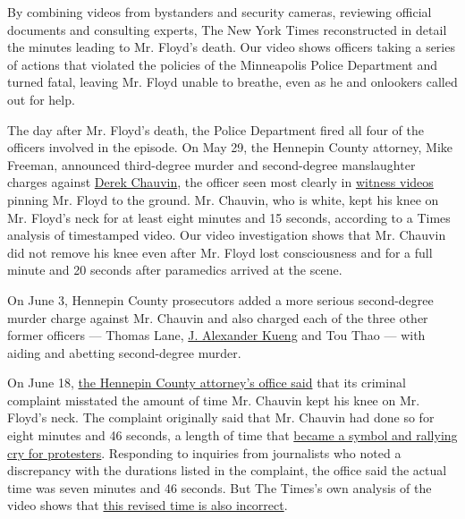 By combining videos from bystanders and security cameras, reviewing
official documents and consulting experts, The New York Times
reconstructed in detail the minutes leading to Mr. Floyd's death. Our
video shows officers taking a series of actions that violated the
policies of the Minneapolis Police Department and turned fatal, leaving
Mr. Floyd unable to breathe, even as he and onlookers called out for
help.

The day after Mr. Floyd's death, the Police Department fired all four of
the officers involved in the episode. On May 29, the Hennepin County
attorney, Mike Freeman, announced third-degree murder and second-degree
manslaughter charges against
\href{https://www.nytimes3xbfgragh.onion/2020/07/22/us/derek-chauvin-tax-fraud.html}{Derek
Chauvin}, the officer seen most clearly in
\href{https://www.nytimes3xbfgragh.onion/2020/06/04/us/politics/george-floyd-witness-maurice-lester-hall.html}{witness
videos} pinning Mr. Floyd to the ground. Mr. Chauvin, who is white, kept
his knee on Mr. Floyd's neck for at least eight minutes and 15 seconds,
according to a Times analysis of timestamped video. Our video
investigation shows that Mr. Chauvin did not remove his knee even after
Mr. Floyd lost consciousness and for a full minute and 20 seconds after
paramedics arrived at the scene.

On June 3, Hennepin County prosecutors added a more serious
second-degree murder charge against Mr. Chauvin and also charged each of
the three other former officers --- Thomas Lane,
\href{https://www.nytimes3xbfgragh.onion/2020/06/27/us/minneapolis-police-officer-kueng.html}{J.
Alexander Kueng} and Tou Thao --- with aiding and abetting second-degree
murder.

On June 18,
\href{https://m.startribune.com/7-minutes-46-seconds-county-says-error-in-timeline-of-floyd-s-killing-won-t-affect-charges/571322872/}{the
Hennepin County attorney's office said} that its criminal complaint
misstated the amount of time Mr. Chauvin kept his knee on Mr. Floyd's
neck. The complaint originally said that Mr. Chauvin had done so for
eight minutes and 46 seconds, a length of time that
\href{https://www.nytimes3xbfgragh.onion/2020/06/18/us/george-floyd-timing.html}{became
a symbol and rallying cry for protesters}. Responding to inquiries from
journalists who noted a discrepancy with the durations listed in the
complaint, the office said the actual time was seven minutes and 46
seconds. But The Times's own analysis of the video shows that
\href{https://www.nytimes3xbfgragh.onion/2020/06/18/us/george-floyd-timing.html}{this
revised time is also incorrect}.

